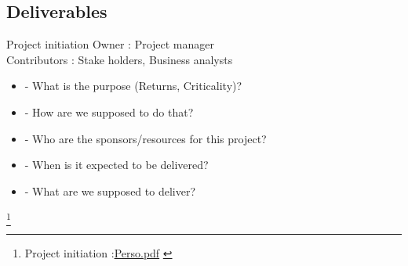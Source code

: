 \documentclass{beamer}
\begin{document}


\subsection{Deliverables}

\begin{frame}{Project initiation}
Owner : Project manager\\
Contributors : Stake holders, Business analysts\\
 \begin{itemize}
  \item
- What is the purpose (Returns, Criticality)?
  \item
- How are we supposed to do that? 
  \item
- Who are the sponsors/resources for this project?
  \item
- When is it expected to be delivered?
  \item
- What are we supposed to deliver?
 \end{itemize}
\footnote{
\footnotesize{
\tiny{Project initiation :\url{Perso.pdf} }}
}
\end{frame}
\end{document}
